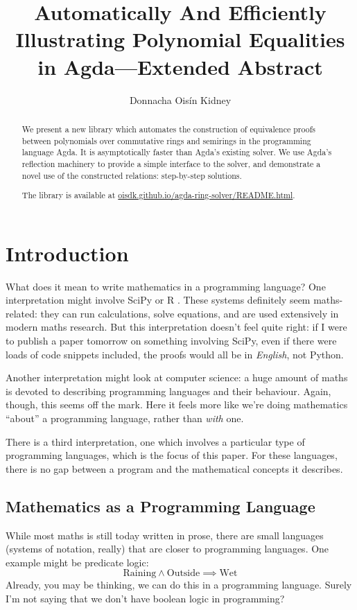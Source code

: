 \documentclass[acmsmall, screen, nonacm, timestamp, review]{acmart}
\author{Donnacha Ois\'in Kidney}
\title{Automatically And Efficiently Illustrating Polynomial Equalities in
  Agda---Extended Abstract}
\theoremstyle{definition}
\theoremstyle{definition}
\begin{document}
\maketitle
\begin{abstract}
  We present a new library which automates the construction of equivalence
  proofs between polynomials over commutative rings and semirings in the
  programming language Agda\cite{norell_dependently_2008}. It is asymptotically
  faster than Agda's existing solver. We use Agda's reflection machinery to
  provide a simple interface to the solver, and demonstrate a novel use of the
  constructed relations: step-by-step solutions.

  The library is available at
  \href{https://oisdk.github.io/agda-ring-solver/README.html}{oisdk.github.io/agda-ring-solver/README.html}.
\end{abstract}
\section{Introduction}
What does it mean to write mathematics in a programming language? One
interpretation might involve SciPy \cite{jones_scipy_2001} or R
\cite{r_core_team_r_2013}. These systems definitely seem maths-related: they can
run calculations, solve equations, and are used extensively in modern maths
research. But this interpretation doesn't feel quite right: if I were to publish
a paper tomorrow on something involving SciPy, even if there were loads of code
snippets included, the proofs would all be in \emph{English}, not Python. 


Another interpretation might look at computer science: a huge amount of maths is
devoted to describing programming languages and their behaviour. Again, though,
this seems off the mark. Here it feels more like we're doing mathematics
``about'' a programming language, rather than \emph{with} one.

There is a third interpretation, one which involves a particular type of
programming languages, which is the focus of this paper. For these languages,
there is no gap between a program and the mathematical concepts it describes.
\subsection{Mathematics as a Programming Language}
While most maths is still today written in prose, there are small\footnotemark
languages (systems of notation, really) that are closer to programming
languages. One example might be predicate logic:
\[ \text{Raining} \wedge \text{Outside} \implies \text{Wet} \]
Already, you may be thinking, we can do this in a programming language. Surely
I'm not saying that we don't have boolean logic in programming?
\end{document}
